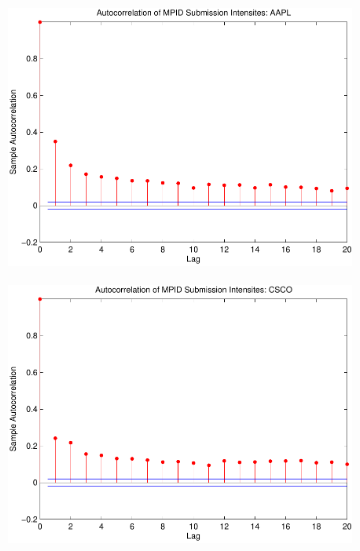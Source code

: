 \documentclass{article}
\begin{document}
\begin{figure}[htp!]
\caption{Autocollerograms for MPID Submission Ratios} \label{ratiostats}
\begin{subfigure}{0.24\textwidth}
\includegraphics[width=\linewidth]{docs/Graphs_MPID_SUB_RATIO_AAPL_30sec_FullTime.pdf}
\end{subfigure}
\hspace*{\fill}
\begin{subfigure}{0.24\textwidth}
\includegraphics[width=\linewidth]{docs/Graphs_MPID_SUB_RATIO_CSCO_30sec_FullTime.pdf}
\end{subfigure}
\begin{subfigure}{0.24\textwidth}

\end{subfigure}
\end{figure}
\end{document}

